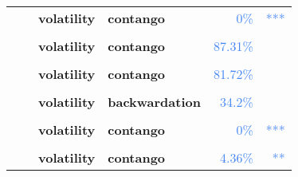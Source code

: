 \documentclass[
  authoryear,
  preprint,
  3p]{elsarticle}
\begin{document}
\begin{longtable}[t]{>{}l>{}l>{}l>{}l>{}r>{}r}
\textbf{} & \textbf{} & \textbf{volatility} & \textbf{contango} & \textcolor[HTML]{4285f4}{0\%} & \textcolor[HTML]{4285f4}{\vphantom{31} ***}\\
\textbf{\cellcolor{gray!10}{}} & \textbf{\cellcolor{gray!10}{post-crisis}} & \textbf{\cellcolor{gray!10}{mean}} & \textbf{\cellcolor{gray!10}{contango}} & \textcolor[HTML]{4285f4}{\cellcolor{gray!10}{75.13\%}} & \textcolor[HTML]{4285f4}{\cellcolor{gray!10}{}}\\
\textbf{} & \textbf{} & \textbf{volatility} & \textbf{contango} & \textcolor[HTML]{4285f4}{87.31\%} & \textcolor[HTML]{4285f4}{}\\
\textbf{\cellcolor{gray!10}{Soybean oil (XCBT)}} & \textbf{\cellcolor{gray!10}{past}} & \textbf{\cellcolor{gray!10}{mean}} & \textbf{\cellcolor{gray!10}{backwardation}} & \textcolor[HTML]{4285f4}{\cellcolor{gray!10}{31.59\%}} & \textcolor[HTML]{4285f4}{\cellcolor{gray!10}{}}\\
\addlinespace
\textbf{} & \textbf{} & \textbf{volatility} & \textbf{contango} & \textcolor[HTML]{4285f4}{81.72\%} & \textcolor[HTML]{4285f4}{}\\
\textbf{\cellcolor{gray!10}{}} & \textbf{\cellcolor{gray!10}{financialisation}} & \textbf{\cellcolor{gray!10}{mean}} & \textbf{\cellcolor{gray!10}{contango}} & \textcolor[HTML]{4285f4}{\cellcolor{gray!10}{92.18\%}} & \textcolor[HTML]{4285f4}{\cellcolor{gray!10}{}}\\
\textbf{} & \textbf{} & \textbf{volatility} & \textbf{backwardation} & \textcolor[HTML]{4285f4}{34.2\%} & \textcolor[HTML]{4285f4}{}\\
\textbf{\cellcolor{gray!10}{}} & \textbf{\cellcolor{gray!10}{crisis}} & \textbf{\cellcolor{gray!10}{mean}} & \textbf{\cellcolor{gray!10}{backwardation}} & \textcolor[HTML]{4285f4}{\cellcolor{gray!10}{18.64\%}} & \textcolor[HTML]{4285f4}{\cellcolor{gray!10}{}}\\
\textbf{} & \textbf{} & \textbf{volatility} & \textbf{contango} & \textcolor[HTML]{4285f4}{0\%} & \textcolor[HTML]{4285f4}{\vphantom{30} ***}\\
\addlinespace
\textbf{\cellcolor{gray!10}{}} & \textbf{\cellcolor{gray!10}{post-crisis}} & \textbf{\cellcolor{gray!10}{mean}} & \textbf{\cellcolor{gray!10}{contango}} & \textcolor[HTML]{4285f4}{\cellcolor{gray!10}{69.59\%}} & \textcolor[HTML]{4285f4}{\cellcolor{gray!10}{}}\\
\textbf{} & \textbf{} & \textbf{volatility} & \textbf{contango} & \textcolor[HTML]{4285f4}{4.36\%} & \textcolor[HTML]{4285f4}{**}\\

\end{longtable}
\end{document}
